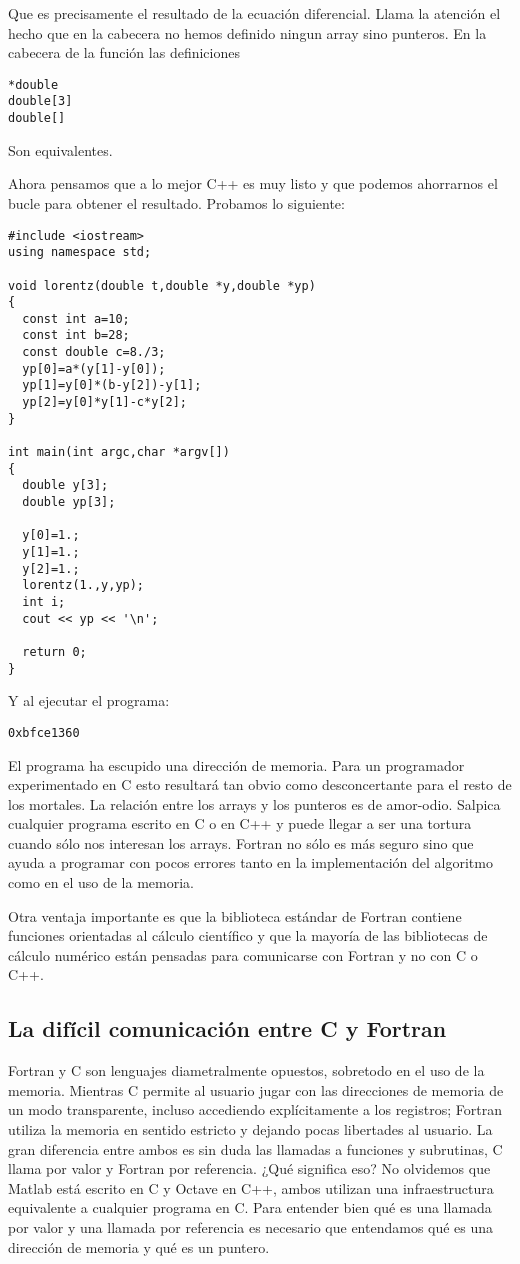 Que es precisamente el resultado de la ecuación diferencial. Llama la
atención el hecho que en la cabecera no hemos definido ningun array
sino punteros.  En la cabecera de la función las definiciones

\begin{verbatim}
*double
double[3]
double[]
\end{verbatim}
Son equivalentes.

Ahora pensamos que a lo mejor C++ es muy listo y que podemos
ahorrarnos el bucle para obtener el resultado.  Probamos lo siguiente:

\begin{verbatim}
#include <iostream>
using namespace std;

void lorentz(double t,double *y,double *yp)
{
  const int a=10;
  const int b=28;
  const double c=8./3;
  yp[0]=a*(y[1]-y[0]);
  yp[1]=y[0]*(b-y[2])-y[1];
  yp[2]=y[0]*y[1]-c*y[2];
}

int main(int argc,char *argv[])
{
  double y[3];
  double yp[3];

  y[0]=1.;
  y[1]=1.;
  y[2]=1.;
  lorentz(1.,y,yp);
  int i;
  cout << yp << '\n';
  
  return 0;
}
\end{verbatim}

Y al ejecutar el programa:
\begin{verbatim}
0xbfce1360
\end{verbatim}
El programa ha escupido una dirección de memoria.  Para un programador
experimentado en C esto resultará tan obvio como desconcertante para
el resto de los mortales.  La relación entre los arrays y los punteros
es de amor-odio.  Salpica cualquier programa escrito en C o en C++ y
puede llegar a ser una tortura cuando sólo nos interesan los arrays.
Fortran no sólo es más seguro sino que ayuda a programar con pocos
errores tanto en la implementación del algoritmo como en el uso de la
memoria.

Otra ventaja importante es que la biblioteca estándar de Fortran
contiene funciones orientadas al cálculo científico y que la mayoría
de las bibliotecas de cálculo numérico están pensadas para comunicarse
con Fortran y no con C o C++.


\subsection{La difícil comunicación entre C y Fortran}
\label{sec:comunica-c-fort}
Fortran y C son lenguajes diametralmente opuestos, sobretodo en el uso
de la memoria. Mientras C permite al usuario jugar con las direcciones
de memoria de un modo transparente, incluso accediendo explícitamente
a los registros; Fortran utiliza la memoria en sentido estricto y
dejando pocas libertades al usuario. La gran diferencia entre ambos es
sin duda las llamadas a funciones y subrutinas, C llama por valor y
Fortran por referencia. ¿Qué significa eso? No olvidemos que Matlab
está escrito en C y Octave en C++, ambos utilizan una infraestructura
equivalente a cualquier programa en C. Para entender bien qué es una
llamada por valor y una llamada por referencia es necesario que
entendamos qué es una dirección de memoria y qué es un puntero.

